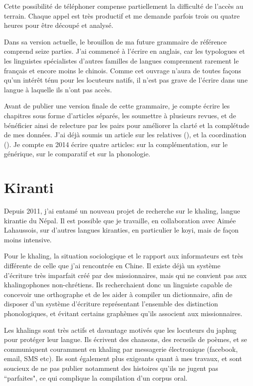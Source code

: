 \documentclass[oldfontcommands,oneside,a4paper,11pt]{memoir}
\begin{document}
Cette possibilité de téléphoner compense partiellement la difficulté de l'accès au terrain. Chaque appel est très productif et me demande parfois trois ou quatre heures pour être découpé et analysé.  

Dans sa version actuelle, le brouillon de ma future grammaire de référence comprend seize parties.  J'ai commencé à l'écrire en anglais, car les typologues et les linguistes spécialistes d'autres familles de langues comprennent rarement le français et encore moins le chinois. Comme cet ouvrage n'aura de toutes façons qu'un intérêt ténu pour les locuteurs natifs, il n'est pas grave de l'écrire dans une langue à laquelle ils n'ont pas accès.  

Avant de publier une version finale de cette grammaire, je compte écrire les chapitres sous forme d'articles séparés, les soumettre à plusieurs revues, et de bénéficier ainsi de relecture par les pairs pour améliorer la clarté et la complétude de mes données. J'ai déjà soumis un article sur les relatives (\citealt{jacques14relatives}), et  la coordination (\citealt{jacques14linking}). Je compte en 2014 écrire quatre articles:   sur la complémentation, sur le générique, sur le comparatif et sur la phonologie.

\section{Kiranti}
Depuis 2011, j'ai entamé un nouveau projet de recherche sur le khaling, langue kirantie du Népal. Il est possible que je travaille, en collaboration avec Aimée Lahaussois, sur d'autres langues kiranties, en particulier le koyi, mais   de façon moins intensive.

Pour le khaling, la situation sociologique et le rapport aux informateurs est très différente de celle que j'ai rencontrée en Chine. Il existe déjà un système d'écriture très imparfait créé par des missionnaires, mais qui ne convient pas aux khalingophones non-chrétiens. Ils recherchaient donc un linguiste  capable de concevoir une orthographe et de les aider à compiler un dictionnaire, afin de disposer d'un système d'écriture représentant l'ensemble des distinction phonologiques, et évitant certains graphèmes qu'ils associent aux missionnaires. 

Les khalings sont très actifs et davantage motivés que les locuteurs du japhug pour protéger leur langue. Ils écrivent des chansons, des recueils de poèmes, et se communiquent couramment en khaling par messagerie électronique (facebook, email, SMS etc). Ils sont également plus exigeants quant à mes travaux, et sont soucieux de ne pas publier notamment des histoires qu'ils ne jugent pas ``parfaites", ce qui complique la compilation d'un corpus oral.
\end{document}

